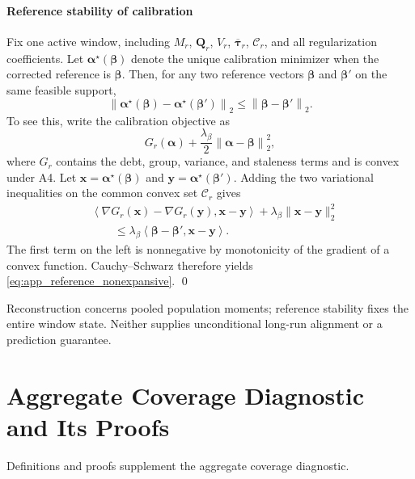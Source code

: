 \paragraph{Reference stability of calibration}
Fix one active window, including $M_r$, $\mathbf Q_r$, $V_r$,
$\overline{\boldsymbol\tau}_r$, $\mathcal C_r$, and all regularization
coefficients.  Let $\boldsymbol\alpha^\star(\boldsymbol\beta)$ denote the
unique calibration minimizer when the corrected reference is
$\boldsymbol\beta$.  Then, for any two reference vectors
$\boldsymbol\beta$ and $\boldsymbol\beta'$ on the same feasible support,
\begin{equation}
 \left\|
 \boldsymbol\alpha^\star(\boldsymbol\beta)
 -
 \boldsymbol\alpha^\star(\boldsymbol\beta')
 \right\|_2
 \le
 \left\|
 \boldsymbol\beta-\boldsymbol\beta'
 \right\|_2.
 \label{eq:app_reference_nonexpansive}
\end{equation}
To see this, write the calibration objective as
\begin{equation}
 G_r(\boldsymbol\alpha)
 +\frac{\lambda_\beta}{2}
 \left\|
 \boldsymbol\alpha-\boldsymbol\beta
 \right\|_2^2,
 \label{eq:app_p2_split}
\end{equation}
where $G_r$ contains the debt, group, variance, and staleness terms and is
convex under A4.  Let
$\mathbf x=\boldsymbol\alpha^\star(\boldsymbol\beta)$ and
$\mathbf y=\boldsymbol\alpha^\star(\boldsymbol\beta')$.  Adding the two
variational inequalities on the common convex set $\mathcal C_r$ gives
\begin{align}
 &\left\langle
 \nabla G_r(\mathbf x)-\nabla G_r(\mathbf y),
 \mathbf x-\mathbf y
 \right\rangle
 +\lambda_\beta\|\mathbf x-\mathbf y\|_2^2
 \nonumber\\
 &\qquad\le
 \lambda_\beta
 \left\langle
 \boldsymbol\beta-\boldsymbol\beta',
 \mathbf x-\mathbf y
 \right\rangle.
 \label{eq:app_reference_vi}
\end{align}
The first term on the left is nonnegative by monotonicity of the gradient of a
convex function.  Cauchy--Schwarz therefore yields
\eqref{eq:app_reference_nonexpansive}.
\qed

Reconstruction concerns pooled population moments; reference stability fixes
the entire window state. Neither supplies unconditional long-run alignment or
a prediction guarantee.

\section{Aggregate Coverage Diagnostic and Its Proofs}
Definitions and proofs supplement the aggregate coverage diagnostic.

